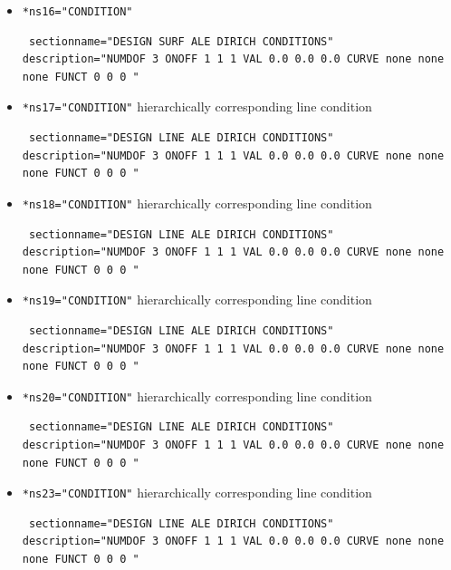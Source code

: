 \begin{itemize}
 \item \verb|*ns16="CONDITION"|
\begin{small} \begin{verbatim} sectionname="DESIGN SURF ALE DIRICH CONDITIONS"
description="NUMDOF 3 ONOFF 1 1 1 VAL 0.0 0.0 0.0 CURVE none none none FUNCT 0 0 0 "
\end{verbatim} \end{small}

 \item \verb|*ns17="CONDITION"| \qquad hierarchically corresponding line condition
\begin{small} \begin{verbatim} sectionname="DESIGN LINE ALE DIRICH CONDITIONS"
description="NUMDOF 3 ONOFF 1 1 1 VAL 0.0 0.0 0.0 CURVE none none none FUNCT 0 0 0 "
\end{verbatim} \end{small}

 \item \verb|*ns18="CONDITION"| \qquad hierarchically corresponding line condition
\begin{small} \begin{verbatim} sectionname="DESIGN LINE ALE DIRICH CONDITIONS"
description="NUMDOF 3 ONOFF 1 1 1 VAL 0.0 0.0 0.0 CURVE none none none FUNCT 0 0 0 "
\end{verbatim} \end{small}

 \item \verb|*ns19="CONDITION"| \qquad hierarchically corresponding line condition
\begin{small} \begin{verbatim} sectionname="DESIGN LINE ALE DIRICH CONDITIONS"
description="NUMDOF 3 ONOFF 1 1 1 VAL 0.0 0.0 0.0 CURVE none none none FUNCT 0 0 0 "
\end{verbatim} \end{small}

 \item \verb|*ns20="CONDITION"| \qquad hierarchically corresponding line condition
\begin{small} \begin{verbatim} sectionname="DESIGN LINE ALE DIRICH CONDITIONS"
description="NUMDOF 3 ONOFF 1 1 1 VAL 0.0 0.0 0.0 CURVE none none none FUNCT 0 0 0 "
\end{verbatim} \end{small}

\item \verb|*ns23="CONDITION"| \qquad hierarchically corresponding line condition
\begin{small} \begin{verbatim} sectionname="DESIGN LINE ALE DIRICH CONDITIONS"
description="NUMDOF 3 ONOFF 1 1 1 VAL 0.0 0.0 0.0 CURVE none none none FUNCT 0 0 0 "
\end{verbatim} \end{small}


\end{itemize}
